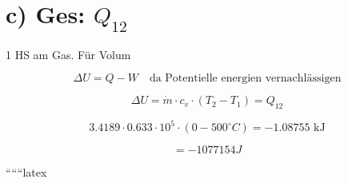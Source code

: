 \section*{c) Ges: $Q_{12}$}

1 HS am Gas. Für Volum

\[
\Delta U = Q - W \quad \text{da Potentielle energien vernachlässigen}
\]

\[
\Delta U = \dot{m} \cdot c_v \cdot (T_2 - T_1) = Q_{12}
\]

\[
3.4189 \cdot 0.633 \cdot 10^5 \cdot (0 - 500^\circ C) = -1.08755 \text{ kJ}
\]

\[
= -1077154 J
\]

``````latex